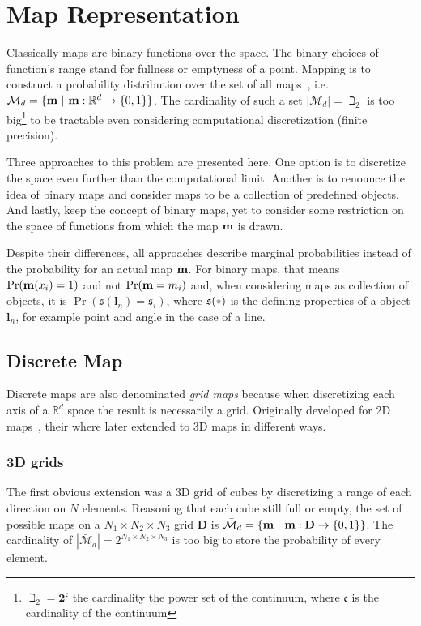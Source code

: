 \section{Map Representation}

Classically maps are binary functions over the space. The
binary choices of function's range stand for fullness or emptyness of a point.
Mapping is to construct a probability distribution over the set of all maps~\cite{thrunprob},
i.e.
$\mathcal{M}_d=\{\mathrm{\mathbf{m}}~|~\mathrm{\mathbf{m}}:\mathbb{R}^d\to\{0,1\}\}$. The
cardinality of such a set
$|\mathcal{M}_d|=\beth_2$ is too big\footnote{$\beth_2=\mathbf{2}^\mathfrak{c}$
the cardinality the power set of the continuum, where $\mathfrak{c}$ is the
cardinality of the continuum } to be tractable even considering computational discretization (finite precision).

Three approaches to this problem are presented here. One option is to discretize
the space even further than the computational limit. Another is to renounce
the idea of binary maps and consider maps to be a collection of predefined
objects. And lastly, keep the concept of binary maps, yet to consider some
restriction on the space of functions from which the map $\mathrm{\mathbf{m}}$ is drawn.

Despite their differences, all approaches describe marginal probabilities
instead of the probability for an actual map $\mathrm{\mathbf{m}}$. For binary maps,
that means $\Pr(\mathrm{\mathbf{m}}(x_i)=1)$ and not $\Pr(\mathrm{\mathbf{m}}=m_i)$ and, when
considering maps as collection of objects, it is
$\Pr(\mathfrak{s}(\mathbf{l}_n)=\mathfrak{s}_i)$, where $\mathfrak{s}(\parm)$ is
the defining properties of a object $\mathbf{l}_n$, for example point and angle
in the case of a line.

\subsection{Discrete Map}

Discrete maps are also denominated \textit{grid maps} because when discretizing
each axis of a $\mathbb{R}^d$ space the result is necessarily a grid. Originally
developed for 2D maps~\cite{thrunprob}, their where later extended to 3D maps
in different ways.

\subsubsection{3D grids}

The first obvious extension was a 3D grid of cubes by discretizing a range
of each direction on $N$ elements. Reasoning that each cube still full
or empty, the set of possible maps on a $N_1\times N_2\times
N_3$ grid $\mathbf{D}$ is
$\bar{\mathcal{M}}_d=\{\mathrm{\mathbf{m}}~|~\mathrm{\mathbf{m}}:\mathbf{D}\to\{0,1\}\}$. The
cardinality of $|\bar{\mathcal{M}}_d|=2^{N_1\times N_2\times
N_3}$ is too big to store the probability of every element. 

